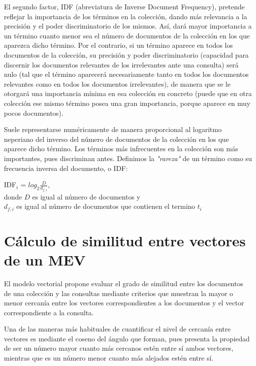 \documentclass[titlepage]{article}
\begin{document}
El segundo factor, IDF (abreviatura de Inverse Document Frequency), pretende reflejar la importancia de los términos en la colección, dando más relevancia a la precisión y el poder discriminatorio de los mismos. Así, dará mayor importancia a un término cuanto menor sea el número de documentos de la colección en los que aparezca dicho término. Por el contrario, si un término aparece en todos los documentos de la colección, su precisión y poder discriminatorio (capacidad para discernir los documentos relevantes de los irrelevantes ante una consulta) será nulo (tal que el término aparecerá necesariamente tanto en todos los documentos relevantes como en todos los documentos irrelevantes), de manera que se le otorgará una importancia mínima en esa colección en concreto (puede que en otra colección ese mismo término posea una gran importancia, porque aparece en muy pocos documentos). 

Suele representarse numéricamente de manera proporcional al logaritmo neperiano del inverso del número de documentos de la colección en los que aparece dicho término. Los términos más infrecuentes en la colección son más importantes, pues discriminan antes. Definimos la \textit{"rareza"} de un término como su frecuencia inversa del documento, o IDF:

\begin{center}
	IDF$_{i}$ = $log_{2} \frac{D}{d_{f, i}}$, \\
	donde $D$ es igual al número de documentos y \\ 
	$d_{f, i}$ es igual al número de documentos que contienen el termino $t_{i}$
\end{center}

\section{Cálculo de similitud entre vectores de un MEV}\label{similitud}

El modelo vectorial propone evaluar el grado de similitud entre los documentos de una colección y las consultas mediante criterios que muestran la mayor o menor cercanía entre los vectores correspondientes a los documentos y el vector correspondiente a la consulta. 

Una de las maneras más habituales de cuantificar el nivel de cercanía entre vectores es mediante el coseno del ángulo que forman, pues presenta la propiedad de ser un número mayor cuanto más cercanos estén entre sí ambos vectores, mientras que es un número menor cuanto más alejados estén entre sí.
\end{document}

